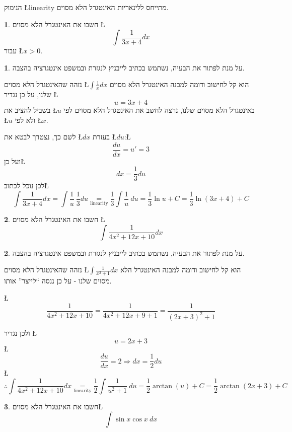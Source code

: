 \documentclass[english,hebrew]{article}
\theoremstyle{definition}
\newtheorem*{problem*}{\protect\problemname}
\theoremstyle{definition}
\newtheorem*{sol*}{\protect\solutionname}
\providecommand{\problemname}{בעיה}
\providecommand{\solutionname}{פתרון}
\begin{document}
הנימוק \L{$\text{linearity}$} מתייחס ללינאריות האינטגרל הלא מסוים.
\begin{problem*}
חשבו את האינטגרל הלא מסוים \L{%
\[
\int\frac{1}{3x+4}dx
\]
}%
 עבור \L{$x>0$}.
\end{problem*}
\begin{sol*}
על מנת לפתור את הבעיה, נשתמש בכתיב לייבניץ לנגזרת ובמשפט אינטגרציה
בהצבה.

נזהה שהאינטגרל הלא מסוים \L{$\int\frac{1}{x}dx$} הוא קל לחישוב ודומה
למבנה האינטגרל הלא מסוים שלנו, על כן נגדיר \L{%
\[
u=3x+4
\]
}%
בשביל להציב את \L{$u$} באינטגרל הלא מסוים שלנו, נרצה לחשב את האינטגרל
הלא מסוים לפי \L{$u$} ולא לפי \L{$x$}.

לשם כך, נצטרך לבטא את \L{$dx$} בעזרת \L{$du$}:\L{%
\[
\frac{du}{dx}=u'=3
\]
}%
ועל כן\L{%
\[
dx=\frac{1}{3}du
\]
}%
לכן נוכל לכתוב\L{%
\[
\int\frac{1}{3x+4}dx=\int\frac{1}{u}\ \frac{1}{3}du\underset{\text{linearity}}{=}\frac{1}{3}\int\frac{1}{u}\ du=\frac{1}{3}\ln u+C=\frac{1}{3}\ln\left(3x+4\right)+C
\]
}%
\end{sol*}
\begin{problem*}
חשבו את האינטגרל הלא מסוים \L{%
\[
\int\frac{1}{4x^{2}+12x+10}dx
\]
}%
\end{problem*}
\begin{sol*}
על מנת לפתור את הבעיה, נשתמש בכתיב לייבניץ לנגזרת ובמשפט אינטגרציה
בהצבה.

נזהה שהאינטגרל הלא מסוים \L{$\int\frac{1}{x^{2}+1}dx$} הוא קל לחישוב
ודומה למבנה האינטגרל הלא מסוים שלנו - על כן ננסה \textquotedblleft לייצר\textquotedblright{}
אותו.\\
\noindent{}

\L{%
\[
\frac{1}{4x^{2}+12x+10}=\frac{1}{4x^{2}+12x+9+1}=\frac{1}{\left(2x+3\right)^{2}+1}
\]
}%

ולכן נגדיר \L{%
\[
u=2x+3
\]
}%
\L{%
\[
\frac{du}{dx}=2\Rightarrow dx=\frac{1}{2}du
\]
}%
\L{%
\[
\therefore\int\frac{1}{4x^{2}+12x+10}dx\underset{\text{linearity}}{=}\frac{1}{2}\int\frac{1}{u^{2}+1}\ du=\frac{1}{2}\arctan\left(u\right)+C=\frac{1}{2}\arctan\left(2x+3\right)+C
\]
}%
\end{sol*}
\begin{problem*}
חשבו את האינטגרל הלא מסוים\L{%
\[
\int\sin x\cos x\ dx
\]
}%
\end{problem*}
\end{document}
